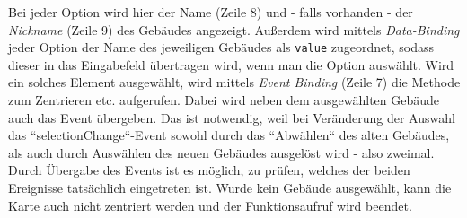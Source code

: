Bei jeder Option wird hier der Name (Zeile 8) und - falls vorhanden - der \textit{Nickname} (Zeile 9) des Gebäudes angezeigt. Außerdem wird mittels \textit{Data-Binding} jeder Option der Name des jeweiligen Gebäudes als \texttt{value} zugeordnet, sodass dieser in das Eingabefeld übertragen wird, wenn man die Option auswählt. Wird ein solches Element ausgewählt, wird mittels \textit{Event Binding} (Zeile 7) die Methode zum Zentrieren etc. aufgerufen. Dabei wird neben dem ausgewählten Gebäude auch das Event übergeben. Das ist notwendig, weil bei Veränderung der Auswahl das ``selectionChange``-Event sowohl durch das ``Abwählen`` des alten Gebäudes, als auch durch Auswählen des neuen Gebäudes ausgelöst wird - also zweimal. Durch Übergabe des Events ist es möglich, zu prüfen, welches der beiden Ereignisse tatsächlich eingetreten ist. Wurde kein Gebäude ausgewählt, kann die Karte auch nicht zentriert werden und der Funktionsaufruf wird beendet.


